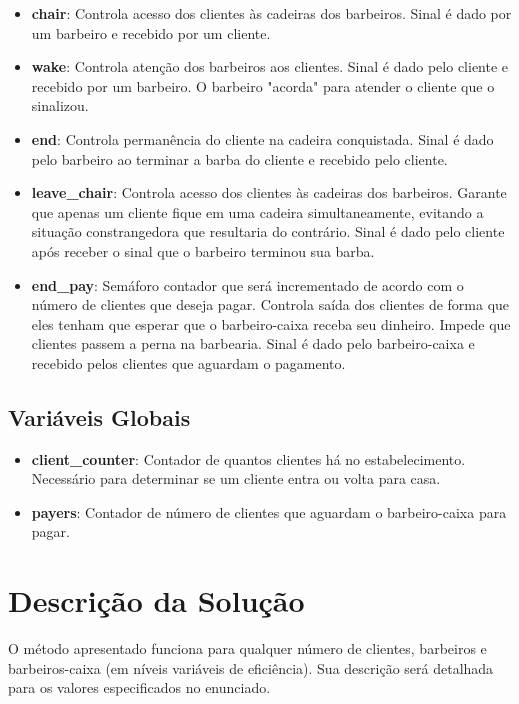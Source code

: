 \documentclass{article}
\begin{document}
\begin{itemize}
    \item \textbf{chair}: Controla acesso dos clientes às cadeiras dos barbeiros. Sinal é dado por um barbeiro e recebido por um cliente.
    \item \textbf{wake}: Controla atenção dos barbeiros aos clientes. Sinal é dado pelo cliente e recebido por um barbeiro. O barbeiro "acorda" para atender o cliente que o sinalizou.
    \item \textbf{end}: Controla permanência do cliente na cadeira conquistada. Sinal é dado pelo barbeiro ao terminar a barba do cliente e recebido pelo cliente.
    \item \textbf{leave\_chair}: Controla acesso dos clientes às cadeiras dos barbeiros. Garante que apenas um cliente fique em uma cadeira simultaneamente, evitando a situação constrangedora que resultaria do contrário. Sinal é dado pelo cliente após receber o sinal que o barbeiro terminou sua barba.
    \item \textbf{end\_pay}: Semáforo contador que será incrementado de acordo com o número de clientes que deseja pagar. Controla saída dos clientes de forma que eles tenham que esperar que o barbeiro-caixa receba seu dinheiro. Impede que clientes passem a perna na barbearia. Sinal é dado pelo barbeiro-caixa e recebido pelos clientes que aguardam o pagamento.
\end{itemize}

\subsection{Variáveis Globais}

\begin{itemize}
    \item \textbf{client\_counter}: Contador de quantos clientes há no estabelecimento. Necessário para determinar se um cliente entra ou volta para casa.
    \item \textbf{payers}: Contador de número de clientes que aguardam o barbeiro-caixa para pagar.
\end{itemize}

\section{Descrição da Solução}

O método apresentado funciona para qualquer número de clientes, barbeiros e barbeiros-caixa (em níveis variáveis de eficiência). Sua descrição será detalhada para os valores especificados no enunciado.
\end{document}
